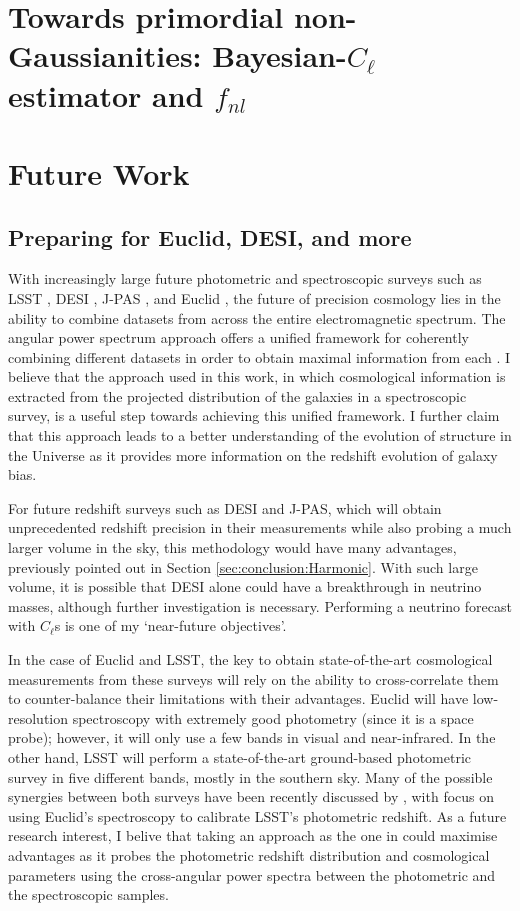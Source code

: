 \section{Towards primordial non-Gaussianities: Bayesian-$C_{\ell}$ estimator and $f_{nl}$}

\section{Future Work} 
\subsection{Preparing for Euclid, DESI, and more}
\label{sec:conclusion:future}
With increasingly large future photometric and spectroscopic surveys such as LSST \citep{2012arXiv1211.0310L}, DESI \citep{2016-DESI}, J-PAS \citep{JPAS}, and Euclid \citep{2011EuclidRedPaper}, the future of precision cosmology lies in the ability to combine datasets from across the entire electromagnetic spectrum. The angular power spectrum approach offers a unified framework for coherently combining different datasets in order to obtain maximal information from each \citep{JoachimiBridle2010,Kirk2015,2016McLeod}. I believe that the approach used in this work, in which cosmological information is extracted from the projected distribution of the galaxies in a spectroscopic survey, is a useful step towards achieving this unified framework. I further claim that this approach leads to a better understanding of the evolution of structure in the Universe as it provides more information on the redshift evolution of galaxy bias.

\qquad For future redshift surveys such as DESI and J-PAS, which will obtain unprecedented redshift precision in their measurements while also probing a much larger volume in the sky, this methodology would have many advantages, previously pointed out in Section \ref{sec:conclusion:Harmonic}. With such large volume, it is possible that DESI alone could have a breakthrough in neutrino masses, although further investigation is necessary. Performing a neutrino forecast with $C_{\ell}$s is one of my `near-future objectives'.

\qquad In the case of Euclid and LSST, the key to obtain state-of-the-art cosmological measurements from these surveys will rely on the ability to cross-correlate them to counter-balance their limitations with their advantages. Euclid will have low-resolution spectroscopy with extremely good photometry (since it is a space probe); however, it will only use a few bands in visual and near-infrared. In the other hand, LSST will perform a state-of-the-art ground-based photometric survey in five different bands, mostly in the southern sky. Many of the possible synergies between both surveys have been recently discussed by \cite{2017EuclidLSST}, with focus on using Euclid's spectroscopy to calibrate LSST's photometric redshift. As a future research interest, I belive that taking an approach as the one in \cite{2016McLeod} could maximise advantages as it probes the photometric redshift distribution and cosmological parameters using the cross-angular power spectra between the photometric and the spectroscopic samples. 

